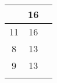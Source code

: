 {\begin{tabularx}{\textwidth}{p{.1em}cc}
\begin{tabular}[t]{cc}
\multicolumn{1}{|c|}{5}                                                        & \multicolumn{1}{c|}{16}                                                             \\ \hline
\multicolumn{1}{|c|}{11}                                                        & \multicolumn{1}{c|}{16}                                                             \\ \hline
\multicolumn{1}{|c|}{8}                                                        & \multicolumn{1}{c|}{13}                                                             \\ \hline
\multicolumn{1}{|c|}{9}                                                        & \multicolumn{1}{c|}{13}                                                             \\ \hline
\end{tabular}

\end{tabularx}}